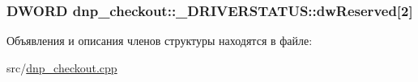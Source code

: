 \hypertarget{structdnp__checkout_1_1___d_r_i_v_e_r_s_t_a_t_u_s_ab4b0e086ec85c03b0cbb36349b7bcc06}{
\subsubsection[{dw\-Reserved}]{\setlength{\rightskip}{0pt plus 5cm}D\-W\-O\-R\-D dnp\-\_\-checkout\-::\-\_\-\-D\-R\-I\-V\-E\-R\-S\-T\-A\-T\-U\-S\-::dw\-Reserved\mbox{[}2\mbox{]}}}\label{structdnp__checkout_1_1___d_r_i_v_e_r_s_t_a_t_u_s_ab4b0e086ec85c03b0cbb36349b7bcc06}


Объявления и описания членов структуры находятся в файле\-:\begin{DoxyCompactItemize}
\item 
src/\hyperlink{dnp__checkout_8cpp}{dnp\-\_\-checkout.\-cpp}\end{DoxyCompactItemize}
